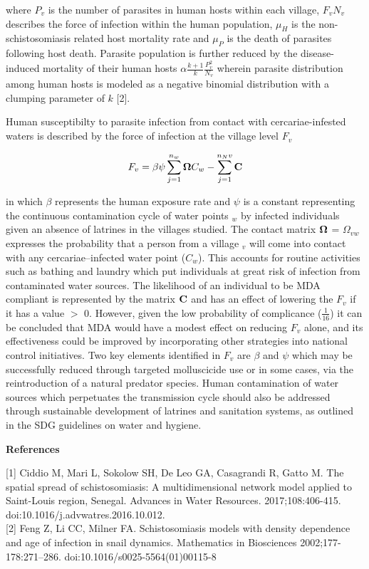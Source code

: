 \documentclass[12pt]{article}
\begin{document}
where $P_v$ is the number of parasites in human hosts within each village, $F_vN_v$ describes the force of infection within the human population, $\mu_H$ is the non-schistosomiasis related host mortality rate and $\mu_P$ is the death of parasites following host death. Parasite population is further reduced by the disease-induced mortality of their human hosts $\alpha \frac{k +1 }{k}\frac{P_v^2}{N_v}$ wherein parasite distribution among human hosts is modeled as a negative binomial distribution with a clumping parameter of $k$ [2].
\bigskip

Human susceptibilty to parasite infection from contact with cercariae-infested waters is described by the force of infection at the village level $F_v$

\begin{equation}\label{eq:ForceofInfection}
F_v = \beta \psi \sum_{j=1}^{n_w} {\bf \Omega} C_w - \sum_{j=1}^{n_Nv} {\bf C}
\end{equation}

in which $\beta$ represents the human exposure rate and $\psi$ is a constant representing the continuous contamination cycle of water points $_w$ by infected individuals given an absence of latrines in the villages studied. The contact matrix ${\bf \Omega}$ = $\Omega_{vw}$ expresses the probability that a person from a village $_v$ will come into contact with any cercariae--infected water point ($C_w$). This accounts for routine activities such as bathing and laundry which put individuals at great risk of infection from contaminated water sources. The likelihood of an individual to be MDA compliant is represented by the matrix $\bf{C}$ and has an effect of lowering the $F_v$ if it has a value $>$ 0. However, given the low probability of complicance ($\frac{1}{16}$) it can be concluded that MDA would have a modest effect on reducing $F_v$ alone, and its effectiveness could be improved by incorporating other strategies into national control initiatives. Two key elements identified in $F_v$ are $\beta$ and $\psi$ which may be successfully reduced through targeted molluscicide use or in some cases, via the reintroduction of a natural predator species. Human contamination of water sources which perpetuates the transmission cycle should also be addressed through sustainable development of latrines and sanitation systems, as outlined in the SDG guidelines on water and hygiene. 

\bigskip

\maketitle \textbf{References}
\linebreak

[1] Ciddio M, Mari L, Sokolow SH, De Leo GA, Casagrandi R, Gatto M. The spatial spread of schistosomiasis: A multidimensional network model applied to Saint-Louis region, Senegal. Advances in Water Resources. 2017;108:406-415. doi:10.1016/j.advwatres.2016.10.012.\\

[2] Feng Z, Li CC, Milner FA. Schistosomiasis models with density dependence and age of infection in snail dynamics. Mathematics in Biosciences 2002;177-178:271–286. doi:10.1016/s0025-5564(01)00115-8
\end{document}
